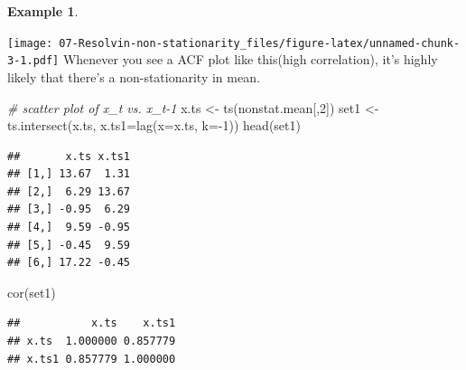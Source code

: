 \documentclass[
]{book}
\newenvironment{Shaded}{\begin{snugshade}}{\end{snugshade}}
\newcommand{\AttributeTok}[1]{\textcolor[rgb]{0.77,0.63,0.00}{#1}}
\newcommand{\CommentTok}[1]{\textcolor[rgb]{0.56,0.35,0.01}{\textit{#1}}}
\newcommand{\DecValTok}[1]{\textcolor[rgb]{0.00,0.00,0.81}{#1}}
\newcommand{\FunctionTok}[1]{\textcolor[rgb]{0.00,0.00,0.00}{#1}}
\newcommand{\NormalTok}[1]{#1}
\newcommand{\OtherTok}[1]{\textcolor[rgb]{0.56,0.35,0.01}{#1}}
\newcommand{\SpecialCharTok}[1]{\textcolor[rgb]{0.00,0.00,0.00}{#1}}
\newcommand{\StringTok}[1]{\textcolor[rgb]{0.31,0.60,0.02}{#1}}
\theoremstyle{definition}
\theoremstyle{definition}
\newtheorem{example}{Example}[chapter]
\theoremstyle{definition}
\theoremstyle{definition}
\theoremstyle{remark}
\begin{document}
\begin{example}
\begin{Shaded}
\end{Shaded}

\begin{Shaded}
\end{Shaded}

\texttt{[image: 07-Resolvin-non-stationarity\_files/figure-latex/unnamed-chunk-3-1.pdf]}
Whenever you see a ACF plot like this(high correlation), it's highly likely that there's a non-stationarity in mean.

\begin{Shaded}
\begin{Highlighting}[]
\CommentTok{\# scatter plot of x\_t vs. x\_t{-}1}
\NormalTok{x.ts }\OtherTok{\textless{}{-}} \FunctionTok{ts}\NormalTok{(nonstat.mean[,}\DecValTok{2}\NormalTok{])}
\NormalTok{set1 }\OtherTok{\textless{}{-}} \FunctionTok{ts.intersect}\NormalTok{(x.ts, }\AttributeTok{x.ts1=}\FunctionTok{lag}\NormalTok{(}\AttributeTok{x=}\NormalTok{x.ts, }\AttributeTok{k=}\SpecialCharTok{{-}}\DecValTok{1}\NormalTok{))}
\FunctionTok{head}\NormalTok{(set1)}
\end{Highlighting}
\end{Shaded}

\begin{verbatim}
##       x.ts x.ts1
## [1,] 13.67  1.31
## [2,]  6.29 13.67
## [3,] -0.95  6.29
## [4,]  9.59 -0.95
## [5,] -0.45  9.59
## [6,] 17.22 -0.45
\end{verbatim}

\begin{Shaded}
\begin{Highlighting}[]
\FunctionTok{cor}\NormalTok{(set1)}
\end{Highlighting}
\end{Shaded}

\begin{verbatim}
##           x.ts    x.ts1
## x.ts  1.000000 0.857779
## x.ts1 0.857779 1.000000
\end{verbatim}


\end{example}
\end{document}
